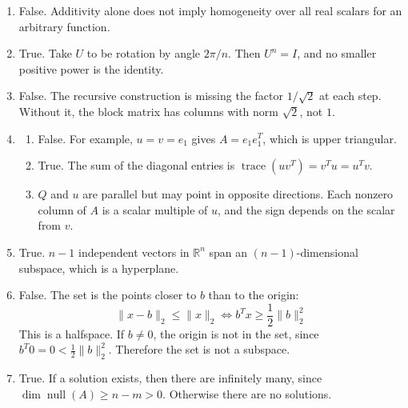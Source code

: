 \begin{enumerate}[label=\textbf{\arabic*.}]
    \item False. Additivity alone does not imply homogeneity over all
    real scalars for an arbitrary function.%

    \item True. Take \(U\) to be rotation by angle \(2\pi/n\). Then
    \(U^n=I\), and no smaller positive power is the identity.

    \item False. The recursive construction is missing the factor
    \(1/\sqrt{2}\) at each step. Without it, the block matrix has columns
    with norm \(\sqrt{2}\), not \(1\).

    \item
    \begin{enumerate}[label=(\alph*)]
        \item False. For example, \(u=v=e_1\) gives
        \(A=e_1e_1^T\), which is upper triangular.
        \item True. The sum of the diagonal entries is
        \(
            \operatorname{trace}(uv^T)=v^Tu=u^Tv.
        \)
        \item \(Q\) and \(u\) are parallel but may point in opposite
        directions. Each nonzero column of \(A\) is a scalar multiple of
        \(u\), and the sign depends on the scalar from \(v\).
    \end{enumerate}

    \item True. \(n-1\) independent vectors in \(\mathbb{R}^n\) span an
    \((n-1)\)-dimensional subspace, which is a hyperplane.

    \item False. The set is the points closer to \(b\) than to the
    origin:
    \[
        \|x-b\|_2\leq \|x\|_2
        \Longleftrightarrow
        b^Tx\geq \frac{1}{2}\|b\|_2^2
    \]
    This is a halfspace. If \(b\neq 0\), the origin is not in the set,
    since \(b^T0=0<\frac{1}{2}\|b\|_2^2\). Therefore the set is not a
    subspace.

    \item True. If a solution exists, then there are infinitely many,
    since \(\dim\operatorname{null}(A)\geq n-m>0\). Otherwise there are
    no solutions.


\end{enumerate}
